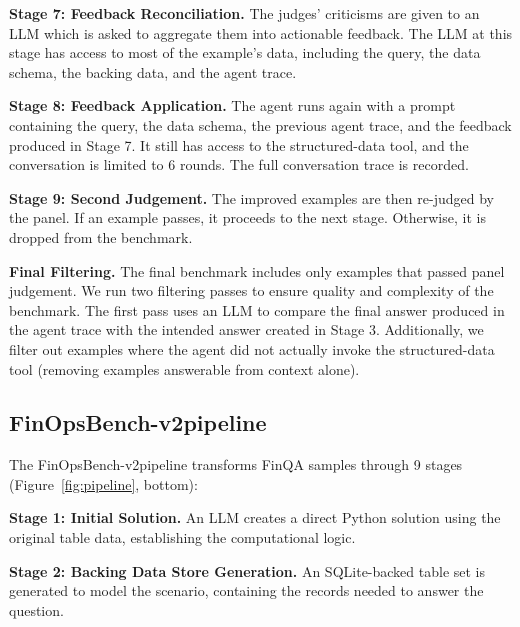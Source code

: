\documentclass[11pt]{article}
\newcommand{\groundedfinqa}{FinOpsBench-v2}\xspace
\begin{document}
\noindent \textbf{Stage 7: Feedback Reconciliation.}
The judges' criticisms are given to an LLM which is asked to aggregate them into actionable feedback. The LLM at this stage has access to most of the example's data, including the query, the data schema, the backing data, and the agent trace.

\noindent \textbf{Stage 8: Feedback Application.}
The agent runs again with a prompt containing the query, the data schema, the previous agent trace, and the feedback produced in Stage 7.
It still has access to the structured-data tool, and the conversation is limited to 6 rounds. The full conversation trace is recorded.

\noindent \textbf{Stage 9: Second Judgement.}
The improved examples are then re-judged by the 
panel.
If an example passes, it proceeds to the next stage. Otherwise, it is dropped from the benchmark.

\noindent \textbf{Final Filtering.}
The final benchmark includes only examples that passed 
panel
judgement. We run two filtering passes to ensure quality and complexity of the benchmark. The first pass uses an LLM to compare the final answer produced in the agent trace with the intended answer created in Stage 3. Additionally, we filter out examples where the agent did not actually invoke the structured-data tool (removing examples answerable from context alone).

\subsection{\groundedfinqa pipeline}

The \groundedfinqa pipeline transforms FinQA samples through 9 stages (Figure~\ref{fig:pipeline}, bottom):

\noindent \textbf{Stage 1: Initial Solution.}
An LLM creates a direct Python solution using the original table data, establishing the computational logic.

\noindent \textbf{Stage 2: Backing Data Store Generation.}
An SQLite-backed table set is generated to model the scenario, containing the records needed to answer the question.
\end{document}
